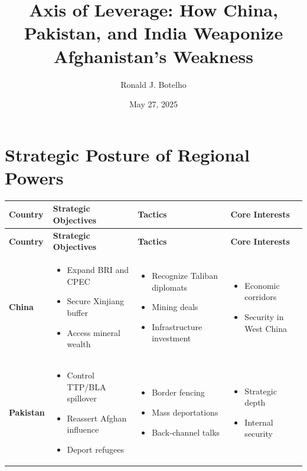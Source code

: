 \documentclass[11pt]{article}
\title{Axis of Leverage: How China, Pakistan, and India Weaponize Afghanistan’s Weakness}
\author{Ronald J. Botelho}
\date{May 27, 2025}
\begin{document}
\maketitle

\section*{Strategic Posture of Regional Powers}

\begin{longtable}{|p{2.5cm}|p{4.5cm}|p{4.5cm}|p{4.5cm}|}
\hline
\textbf{Country} & \textbf{Strategic Objectives} & \textbf{Tactics} & \textbf{Core Interests} \\
\hline
\endfirsthead

\hline
\textbf{Country} & \textbf{Strategic Objectives} & \textbf{Tactics} & \textbf{Core Interests} \\
\hline
\endhead

\textbf{China} &
\begin{itemize}[leftmargin=*]
\item Expand BRI and CPEC
\item Secure Xinjiang buffer
\item Access mineral wealth
\end{itemize} &
\begin{itemize}[leftmargin=*]
\item Recognize Taliban diplomats
\item Mining deals
\item Infrastructure investment
\end{itemize} &
\begin{itemize}[leftmargin=*]
\item Economic corridors
\item Security in West China
\end{itemize} \\
\hline

\textbf{Pakistan} &
\begin{itemize}[leftmargin=*]
\item Control TTP/BLA spillover
\item Reassert Afghan influence
\item Deport refugees
\end{itemize} &
\begin{itemize}[leftmargin=*]
\item Border fencing
\item Mass deportations
\item Back-channel talks
\end{itemize} &
\begin{itemize}[leftmargin=*]
\item Strategic depth
\item Internal security
\end{itemize} \\
\hline


\end{longtable}
\end{document}

